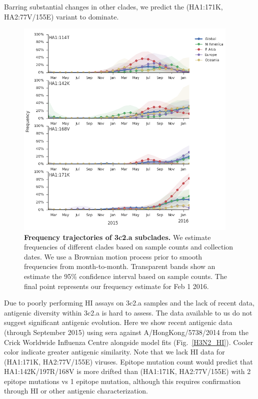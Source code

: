 \documentclass[11pt,oneside,letterpaper]{article}
\begin{document}
\pagebreak

Barring substantial changes in other clades, we predict the (HA1:171K, HA2:77V/155E) variant to dominate.

\begin{figure}[H]
	\centering		
	\includegraphics[width=0.95\textwidth]{../figures/feb-2016/H3N2_mutations.png}
	\caption{\textbf{Frequency trajectories of 3c2.a subclades.}
	We estimate frequencies of different clades based on sample counts and collection dates.
	We use a Brownian motion process prior to smooth frequencies from month-to-month.
	Transparent bands show an estimate the 95\% confidence interval based on sample counts.
	The final point represents our frequency estimate for Feb 1 2016.	
	}
	\label{H3N2_mutations}
\end{figure}

\pagebreak

Due to poorly performing HI assays on 3c2.a samples and the lack of recent data, antigenic diversity within 3c2.a is hard to assess. The data available to us do not suggest significant antigenic evolution. Here we show recent antigenic data (through September 2015) using sera against A/HongKong/5738/2014 from the Crick Worldwide Influenza Centre alongside model fits \cite{neher2015prediction} (Fig.\ \ref{H3N2_HI}). Cooler color indicate greater antigenic similarity. Note that we lack HI data for (HA1:171K, HA2:77V/155E) viruses. Epitope mutation count would predict that HA1:142K/197R/168V is more drifted than (HA1:171K, HA2:77V/155E) with 2 epitope mutations vs 1 epitope mutation, although this requires confirmation through HI or other antigenic characterization.
\end{document}
